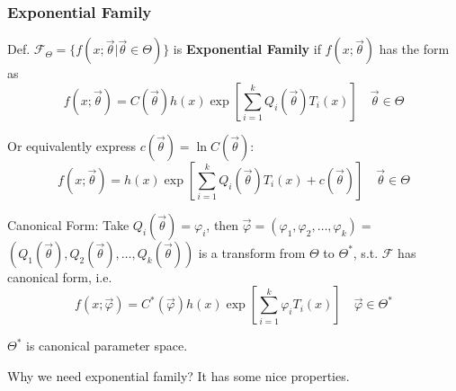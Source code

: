 \subsubsection{Exponential Family}\label{SubSectionExponentialFamily}
        Def. $\mathscr{F}_\Theta=\{f(x;\vec{\theta}|\vec{\theta}\in\Theta)\}$ is \textbf{Exponential Family} if $f(x;\vec{\theta})$ has the form as
\begin{equation}
    f(x;\vec{\theta})=C(\vec{\theta})h(x)\exp \left[  \sum_{i=1}^k Q_i(\vec{\theta})T_i(x) \right]\quad\vec{\theta}\in\Theta
\end{equation}    

    Or equivalently express $ c(\vec{\theta })=\ln C(\vec{\theta }) $:
\begin{equation}
    f(x;\vec{\theta})=h(x)\exp \left[  \sum_{i=1}^k Q_i(\vec{\theta})T_i(x) +c(\vec{\theta }) \right]\quad\vec{\theta}\in\Theta
\end{equation}   

    Canonical Form: Take $Q_i(\vec{\theta})=\varphi_i$, then $\vec{\varphi}=(\varphi_1,\varphi_2,\ldots,\varphi_k)=$$(Q_1(\vec{\theta}),Q_2(\vec{\theta}),\ldots,Q_k(\vec{\theta}))$ is a transform from $\Theta$ to $\Theta^*$, s.t. $\mathscr{F}$ has canonical form, i.e.
    \begin{equation}\label{EqaExponentialDistributionFamily}
        f(x;\vec{\varphi})=C^*(\vec{\varphi})h(x)   \exp\left[  \sum_{i=1}^k \varphi_i T_i(x) \right] \quad \vec{\varphi}\in\Theta^*
    \end{equation}

    $\Theta^*$ is canonical parameter space.

    

\begin{point}
    Why we need exponential family? It has some nice properties.
\end{point}




